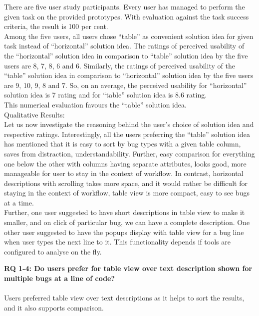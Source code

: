 There are five user study participants. Every user has managed to perform the given task on the provided prototypes. With evaluation against the task success criteria, the result is 100 per cent. \\

Among the five users, all users chose “table” as convenient solution idea for given task instead of “horizontal” solution idea. The ratings of perceived usability of the “horizontal” solution idea in comparison to “table” solution idea by the five users are 8, 7, 8, 6 and 6. Similarly, the ratings of perceived usability of the “table” solution idea in comparison to “horizontal” solution idea by the five users are 9, 10, 9, 8 and 7. So, on an average, the perceived usability for “horizontal” solution idea is 7 rating and for “table” solution idea is 8.6 rating. \\

This numerical evaluation favours the “table” solution idea. \\

Qualitative Results: \\

Let us now investigate the reasoning behind the user’s choice of solution idea and respective ratings. Interestingly, all the users preferring the “table” solution idea has mentioned that it is easy to sort by bug types with a given table column, saves from distraction, understandability. Further, easy comparison for everything one below the other with columns having separate attributes, looks good, more manageable for user to stay in the context of workflow. In contrast, horizontal descriptions with scrolling takes more space, and it would rather be difficult for staying in the context of workflow, table view is more compact, easy to see bugs at a time. \\

Further, one user suggested to have short descriptions in table view to make it smaller, and on click of particular bug, we can have a complete description. One other user suggested to have the popups display with table view for a bug line when user types the next line to it. This functionality depends if tools are configured to analyse on the fly. \\

\begin{myboxi}{{\textbf{RQ 1-4: Do users prefer for table view over text description shown for multiple bugs at a line of code?}}}
	\\ \\ Users preferred table view over text descriptions as it helps to sort the results, and it also supports comparison.
\end{myboxi}
\hfill \break

